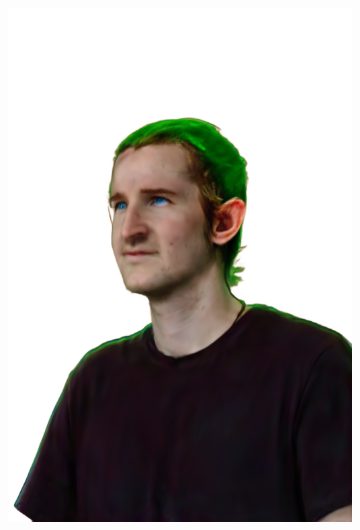 \begin{figure}
\begin{subfigure}{0.18\linewidth}
        \includegraphics[width=\textwidth]{Figures/results/low/ephra_elf/34_render.png}
	\end{subfigure}
    \begin{subfigure}{0.18\linewidth}

\end{subfigure}
\end{figure}
